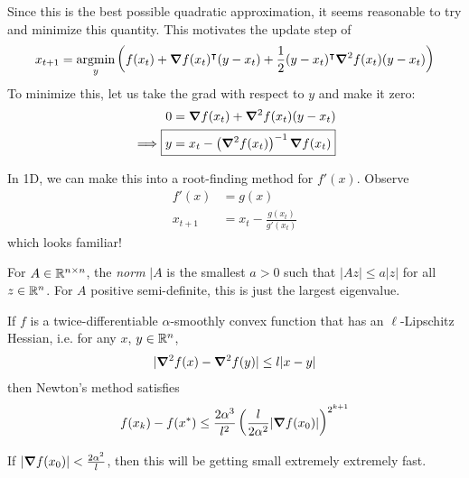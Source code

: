\documentclass{../../template/note}
\begin{document}
    Since this is the best possible quadratic approximation, it seems reasonable to try and minimize this quantity. This motivates the update step of
    \begin{align*}
        x_{t+1} = \argmin_y \left(f(x_t) + \grad f(x_t)^\intercal (y-x_t) + \frac 1 2 (y-x_t)^\intercal \grad^2 f(x_t) (y-x_t)\right)
    \end{align*}
    To minimize this, let us take the grad with respect to $y$ and make it zero:
    \begin{align*}
        0 &= \grad f(x_t) + \grad^2 f(x_t) (y-x_t) \\
        \implies \Aboxed{y &= x_t - \left(\grad^2 f(x_t)\right)^{-1} \grad f(x_t)}
    \end{align*}
    
    In 1D, we can make this into a root-finding method for $f'(x)$. Observe
    \begin{align*}
        f'(x) &= g(x) \\
        x_{t+1} &= x_t - \frac{g(x_t)}{g'(x_t)}
    \end{align*}
    which looks familiar!

    \begin{definition}
        For $A \in \mathbb R^{n \times n}$, the \emph{norm} $|A$ is the smallest $a > 0$ such that $|Az| \leq a|z|$ for all $z \in \mathbb R^n$. For $A$ positive semi-definite, this is just the largest eigenvalue.
    \end{definition}
    
    \begin{theorem}
        If $f$ is a twice-differentiable $\alpha$-smoothly convex function that has an $\ell$-Lipschitz Hessian, i.e. for any $x$, $y \in \mathbb R^n$,
        \begin{align*}
            |\grad^2 f(x) - \grad^2 f(y)| \leq l|x-y|
        \end{align*}
        then Newton's method satisfies
        \begin{align*}
            f(x_k) - f(x^*) \leq \frac{2\alpha^3}{l^2} \left(\frac{l}{2\alpha^2}|\grad f(x_0)|\right)^{2^{k+1}}
        \end{align*}
    \end{theorem}
    
    \begin{remark*}
        If $|\grad f(x_0)| < \frac{2\alpha^2}{l}$, then this will be getting small extremely extremely fast.
    \end{remark*}
    
\end{document}
